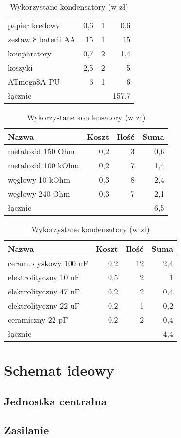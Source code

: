 \documentclass{article}
\begin{document}
\begin{table}[!htbp]
\begin{tabular}{l|r|r|r}
papier kredowy                 & 0,6  & 1     & 0,6   \\
zestaw 8 baterii AA            & 15   & 1     & 15    \\
komparatory                    & 0,7  & 2     & 1,4   \\
koszyki                        & 2,5  & 2     & 5     \\
ATmega8A-PU                    & 6    & 1     & 6     \\
\hline
łącznie                          &      &       & 157,7
\end{tabular}
\centering
\caption{Wykorzystane rezystory (w zł)}
\begin{tabular}{l|r|r|r}
Nazwa          & Koszt & Ilość & Suma \\
\hline
metaloxid 150 Ohm  & 0,2 & 3 & 0,6 \\
metaloxid 100 kOhm & 0,2 & 7 & 1,4 \\
węglowy 10 kOhm    & 0,3 & 8 & 2,4 \\
węglowy 240 Ohm    & 0,3 & 7 & 2,1 \\
\hline
łącznie           &     &   & 6,5
\end{tabular}

\caption{Wykorzystane kondensatory (w zł)}
\begin{tabular}{l|r|r|r}
Nazwa          & Koszt & Ilość & Suma \\
\hline
ceram. dyskowy 100 nF & 0,2 & 12 & 2,4 \\
elektrolityczny 10 uF & 0,5 & 2  & 1   \\
elektrolityczny 47 uF & 0,2 & 2  & 0,4 \\
elektrolityczny 22 uF & 0,2 & 1  & 0,2 \\
ceramiczny 22 pF      & 0,2 & 2  & 0,4 \\
\hline
łącznie                &     & & 4,4
\end{tabular}
\end{table}

\section{Schemat ideowy}

\subsection{Jednostka centralna}


\subsection{Zasilanie}

\end{document}
